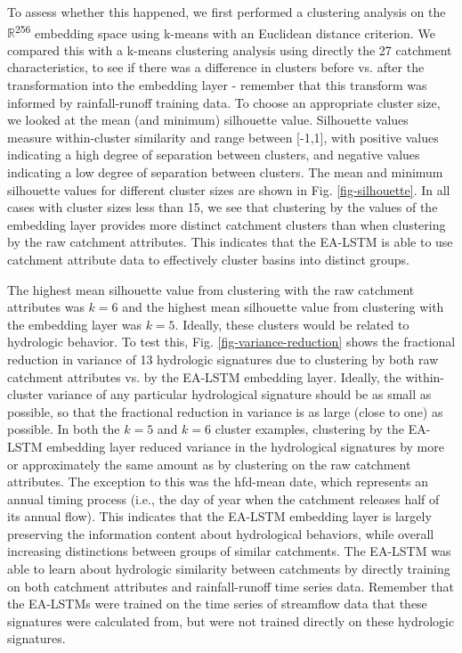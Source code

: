 To assess whether this happened, we first performed a clustering analysis on the $\mathbb{R}$\textsuperscript{256} embedding space using k-means with an Euclidean distance criterion. We compared this with a k-means clustering analysis using directly the 27 catchment characteristics, to see if there was a difference in clusters before vs. after the transformation into the embedding layer - remember that this transform was informed by rainfall-runoff training data. To choose an appropriate cluster size, we looked at the mean (and minimum) silhouette value. Silhouette values measure within-cluster similarity and range between [-1,1], with positive values indicating a high degree of separation between clusters, and negative values indicating a low degree of separation between clusters. The mean and minimum silhouette values for different cluster sizes are shown in Fig. \ref{fig-silhouette}. 
In all cases with cluster sizes less than 15, we see that clustering by the values of the embedding layer provides more distinct catchment clusters than when clustering by the raw catchment attributes. This indicates that the \gls{EA-LSTM} is able to use catchment attribute data to effectively cluster basins into distinct groups.

The highest mean silhouette value from clustering with the raw catchment attributes was $k=6$ and the highest mean silhouette value from clustering with the embedding layer was $k=5$. Ideally, these clusters would be related to hydrologic behavior. To test this, Fig. \ref{fig-variance-reduction} shows the fractional reduction in variance of 13 hydrologic signatures due to clustering by both raw catchment attributes vs. by the \gls{EA-LSTM} embedding layer. Ideally, the within-cluster variance of any particular hydrological signature should be as small as possible, so that the fractional reduction in variance is as large (close to one) as possible. In both the $k=5$ and $k=6$ cluster examples, clustering by the \gls{EA-LSTM} embedding layer reduced variance in the hydrological signatures by more or approximately the same amount as by clustering on the raw catchment attributes. The exception to this was the hfd-mean date, which represents an annual timing process (i.e., the day of year when the catchment releases half of its annual flow). This indicates that the \gls{EA-LSTM} embedding layer is largely preserving the information content about hydrological behaviors, while overall increasing distinctions between groups of similar catchments. The \gls{EA-LSTM} was able to learn about hydrologic similarity between catchments by directly training on both catchment attributes and rainfall-runoff time series data. Remember that the \glspl{EA-LSTM} were trained on the time series of streamflow data that these signatures were calculated from, but were not trained directly on these hydrologic signatures.

